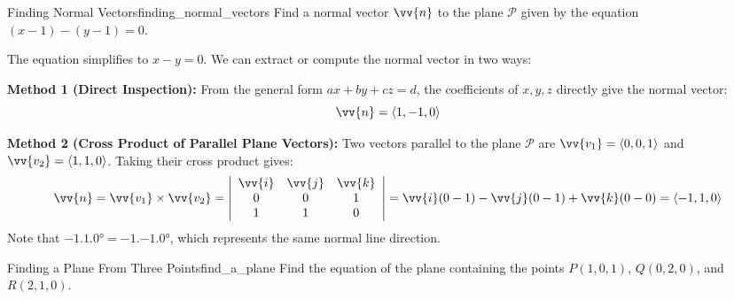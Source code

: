 \begin{problem}{Finding Normal Vectors}{finding_normal_vectors}
Find a normal vector $\vv{n}$ to the plane $\mathcal{P}$ given by the equation $(x - 1) - (y - 1) = 0$.
\end{problem}

\begin{sol}
The equation simplifies to $x - y = 0$. We can extract or compute the normal vector in two ways:

\textbf{Method 1 (Direct Inspection):}
From the general form $ax + by + cz = d$, the coefficients of $x, y, z$ directly give the normal vector:
\[
\vv{n} = \ang{1, -1, 0}
\]

\textbf{Method 2 (Cross Product of Parallel Plane Vectors):}
Two vectors parallel to the plane $\mathcal{P}$ are $\vv{v_1} = \ang{0, 0, 1}$ and $\vv{v_2} = \ang{1, 1, 0}$. Taking their cross product gives:
\[
\vv{n} = \vv{v_1} \times \vv{v_2} = 
\left| \begin{array}{ccc}
\vv{i} & \vv{j} & \vv{k} \\
0 & 0 & 1 \\
1 & 1 & 0
\end{array} \right|
= \vv{i}(0 - 1) - \vv{j}(0 - 1) + \vv{k}(0 - 0) = \ang{-1, 1, 0}
\]
Note that $\ang{-1, 1, 0} = -\ang{1, -1, 0}$, which represents the same normal line direction.
\end{sol}

\begin{problem}{Finding a Plane From Three Points}{find_a_plane}
Find the equation of the plane containing the points $P(1, 0, 1)$, $Q(0, 2, 0)$, and $R(2, 1, 0)$.
\end{problem}

